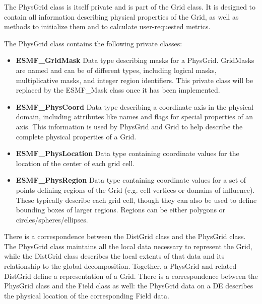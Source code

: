 %

\label{sec:PhysGridClasses}


The PhysGrid class is itself private and is part of the Grid
class.  It is designed to contain all information describing physical
properties of the Grid, as well as methods to initialize them and to
calculate user-requested metrics.

The PhysGrid class contains the following private classes:
\begin{itemize}

\item {\bf ESMF\_GridMask} Data type describing masks for a PhysGrid. 
GridMasks are named and can be of different types, including logical masks,
multiplicative masks, and integer region identifiers.  This private class
will be replaced by the ESMF_Mask class once it has been implemented.

\item {\bf ESMF\_PhysCoord} Data type describing a coordinate axis in the
physical domain, including attributes like names and flags for special
properties of an axis.  This information is used by PhysGrid and Grid
to help describe the complete physical properties of a Grid.

\item {\bf ESMF\_PhysLocation} Data type containing coordinate values for 
the location of the center of each grid cell.

\item {\bf ESMF\_PhysRegion} Data type containing coordinate values for a set
of points defining regions of the Grid (e.g. cell vertices or domains of
influence).  These typically describe each grid cell, though they can also be
used to define bounding boxes of larger regions.  Regions can be either
polygons or circles/spheres/ellipses.

\end{itemize}






There is a correspondence between the DistGrid class and the PhysGrid
class.  The PhysGrid class maintains all the local data necessary to
represent the Grid, while the DistGrid class describes the local extents
of that data and its relationship to the global decomposition.
Together, a PhysGrid and related DistGrid define a representation of
a Grid.  There is a correspondence between the PhysGrid class and the Field
class as well:  the PhysGrid data on a DE describes the physical location
of the corresponding Field data.

